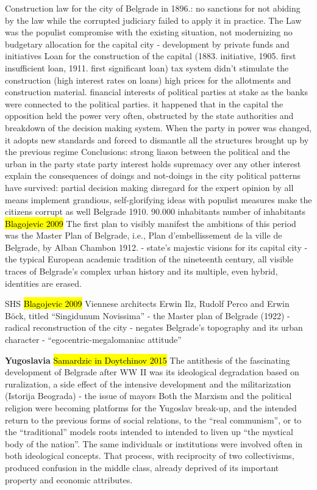 \documentclass[11pt]{report}
\begin{document}
Construction law for the city of Belgrade in 1896.:
no sanctions for not abiding by the law while
the corrupted judiciary failed to apply it in practice.
The Law was the populist compromise with the existing situation,
not modernizing
no budgetary allocation for the capital city - development
 by private funds and initiatives
Loan for the construction of the capital (1883. initiative, 1905.
first insufficient loan, 1911. first significant loan)
	tax system didn't stimulate the construction (high interest rates on loans)
high prices for the allotments and construction material.
financial interests of political parties at stake as the banks were
connected to the political parties. it happened that in the capital
the opposition held the power very often, obstructed by the state authorities
and breakdown of the decision making system. When the party
in power was changed, it adopts new standards and forced
to dismantle all the structures brought up by the previous regime
	Conclusions:
strong liason between the political and the urban in the party state
party interest holds supremacy over any other interest
explain the consequences of doings and not-doings in the city
	political patterns have survived:
partial decision making
disregard for the expert opinion
by all means implement grandious, self-glorifying ideas
with populist measures make the citizens corrupt as well
	Belgrade 1910. 90.000 inhabitants
number of inhabitants
	\hl{Blagojevic 2009}
The first plan to visibly manifest the ambitions of this period was the Master Plan of Belgrade, i.e., Plan d’embellissement de la ville de Belgrade, by Alban Chambon 1912. -  state’s majestic visions for its capital city - the typical European academic tradition of the nineteenth century, all visible traces of Belgrade’s complex urban  history  and  its  multiple,  even  hybrid,  identities  are  erased.

SHS
\hl{Blagojevic 2009}
Viennese architects Erwin Ilz, Rudolf Perco and Erwin Böck, titled 
“Singidunum Novissima” - the Master plan of Belgrade (1922)  - radical reconstruction of the city - negates  Belgrade’s  topography  and  its  urban  character -  “egocentric-megalomaniac attitude”

\textbf{Yugoslavia}
\hl{Samardzic in Doytchinov 2015} 
The antithesis of the fascinating development of Belgrade after WW II was its ideological  degradation  based  on  ruralization,  a  side  effect  of  the  intensive development and the militarization (Istorija Beograda) - the issue of mayors
Both  the  Marxism  and  the  political religion were becoming platforms for the Yugoslav break-up, and the intended return to the previous forms of social relations, to the “real communism”, or to the “traditional” models roots intended to intended to liven up “the mystical body of the nation”. The same individuals or institutions were involved often in both ideological concepts. That process, with reciprocity of two collectivisms, produced  confusion  in  the  middle  class,  already  deprived  of  its  important property and economic attributes. 
\end{document}
